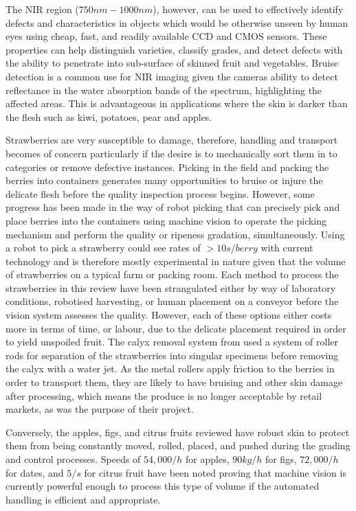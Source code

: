 \documentclass[fleqn,twoside,12pt]{report}
\begin{document}
The NIR region ($750nm-1000nm$), however, can be used to effectively identify defects and characteristics in objects which would be otherwise unseen by human eyes using cheap, fast, and readily available CCD and CMOS sensors. These properties can help distinguish varieties, classify grades, and detect defects with the ability to penetrate into sub-surface of skinned fruit and vegetables. Bruise detection is a common use for NIR imaging given the cameras ability to detect reflectance in the water absorption bands of the spectrum, highlighting the affected areas. This is advantageous in applications where the skin is darker than the flesh such as kiwi, potatoes, pear and apples.

Strawberries are very susceptible to damage, therefore, handling and transport becomes of concern particularly if the desire is to mechanically sort them in to categories or remove defective instances. Picking in the field and packing the berries into containers generates many opportunities to bruise or injure the delicate flesh before the quality inspection process begins. However, some progress has been made in the way of robot picking that can precisely pick and place berries into the containers using machine vision to operate the picking mechanism and perform the quality or ripeness gradation, simultaneously. Using a robot to pick a strawberry could see rates of $>10s/berry$ with current technology and is therefore mostly experimental in nature given that the volume of strawberries on a typical farm or packing room. Each method to process the strawberries in this review have been strangulated either by way of laboratory conditions, robotised harvesting, or human placement on a conveyor before the vision system assesses the quality. However, each of these options either costs more in terms of time, or labour, due to the delicate placement required in order to yield unspoiled fruit. The calyx removal system from \cite{lin} used a system of roller rods for separation of the strawberries into singular specimens before removing the calyx with a water jet. As the metal rollers apply friction to the berries in order to transport them, they are likely to have bruising and other skin damage after processing, which means the produce is no longer acceptable by retail markets, as was the purpose of their project. 

Conversely, the apples, figs, and citrus fruits reviewed have robust skin to protect them from being constantly moved, rolled, placed, and pushed during the grading and control processes. Speeds of $54,000/h$ for apples, $90kg/h$ for figs, $72,000/h$ for dates, and $5/s$ for citrus fruit have been noted proving that machine vision is currently powerful enough to process this type of volume if the automated handling is efficient and appropriate.
\end{document}
